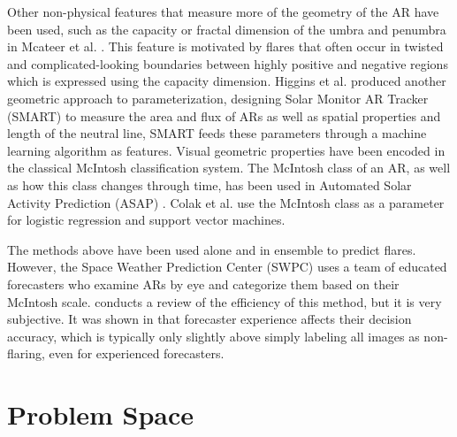 \documentclass[defaultstyle,11pt]{thesis}
\begin{document}
Other non-physical features that measure more of the geometry of the AR have been used, such as the capacity or fractal dimension of the umbra and penumbra in Mcateer et al. \cite{mcateer_gallagher_conlon_2010}. This feature is motivated by flares that often occur in twisted and complicated-looking boundaries between highly positive and negative regions which is expressed using the capacity dimension. Higgins et al. \cite{higgins_gallagher_mcateer_bloomfield_2011} produced another geometric approach to parameterization, designing Solar Monitor AR Tracker (SMART) to measure the area and flux of ARs as well as spatial properties and length of the neutral line, SMART feeds these parameters through a machine learning algorithm as features. Visual geometric properties have been encoded in the classical McIntosh \cite{MCintosh} classification system. The McIntosh class of an AR, as well as how this class changes through time, has been used in Automated Solar Activity Prediction (ASAP) \cite{colak_qahwaji_2007} \cite{colak_qahwaji_2009}. Colak et al. use the McIntosh class as a parameter for logistic regression and support vector machines.

The methods above have been used alone and in ensemble to predict flares. However, the Space Weather Prediction Center (SWPC) uses a team of educated forecasters who examine ARs by eye and categorize them based on their McIntosh \cite{MCintosh} scale.  \cite{VerificationCurrentMethod} conducts a review of the efficiency of this method, but it is very subjective. It was shown in \cite{VerificationCurrentMethod} that forecaster experience affects their decision accuracy, which is typically only slightly above simply labeling all images as non-flaring, even for experienced forecasters.

\section{Problem Space}
\label{sec:problemspace}
\end{document}
